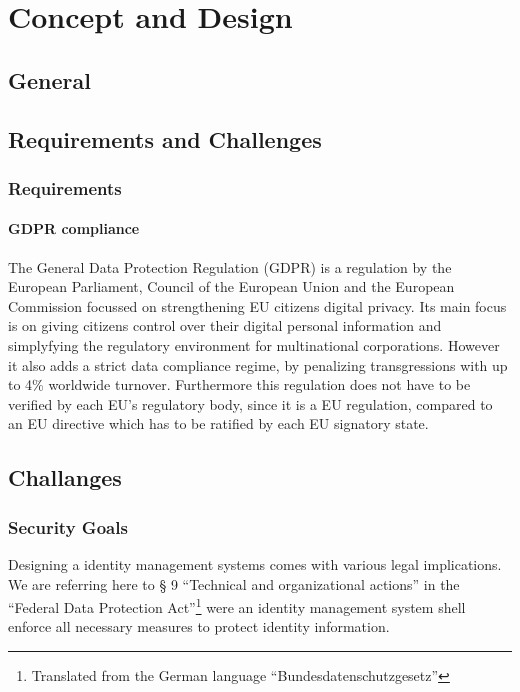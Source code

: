 \chapter{Concept and Design}
\label{cha:conceptanddesign}

\section{General}

\section{Requirements and Challenges}

\subsection{Requirements}

\subsubsection{GDPR compliance}
The General Data Protection Regulation (GDPR) is a regulation by the European Parliament, Council of the European Union and the European Commission focussed on strengthening EU citizens digital privacy.  Its main focus is on giving citizens control over their digital personal information and simplyfying the regulatory environment for multinational corporations. However it also adds a strict data compliance regime, by penalizing transgressions with up to 4\% worldwide turnover. Furthermore this regulation does not have to be verified by each EU's regulatory body, since it is a EU regulation, compared to an EU directive which has to be ratified by each EU signatory state.

\section{Challanges}
\label{sec:challanges}

\subsection{Security Goals}
\label{sec:securityGoals}

Designing a identity management systems comes with various legal implications. We are referring here to § 9 “Technical and organizational actions” in the “Federal Data Protection Act”\footnote{Translated from the German language “Bundesdatenschutzgesetz”} were an identity management system shell enforce all necessary measures to protect identity information.\cite{bdsg}

